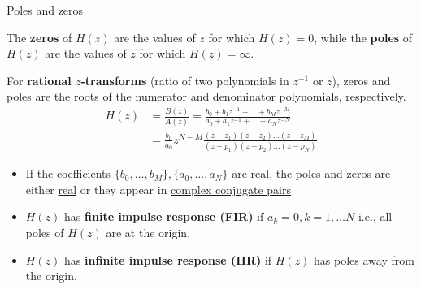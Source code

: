 \documentclass[10pt, handout]{beamer}
\begin{document}
\begin{frame}{Poles and zeros}

The \textbf{zeros} of $H(z)$ are the values of $z$ for which $H(z) = 0$, while the \textbf{poles} of $H(z)$ are the values of $z$ for which $H(z) = \infty$. 

For \textbf{rational $z$-transforms} (ratio of two polynomials in $z^{-1}$ or $z$), zeros and poles are the roots of the numerator and denominator polynomials, respectively.
\begin{align*}
H(z) &= \frac{B(z)}{A(z)} = \frac{b_0 + b_1z^{-1}+\ldots+b_Mz^{-M}}{a_0 + a_1z^{-1}+\ldots+a_Nz^{-N}} \\
&= \frac{b_0}{a_0}z^{N-M}\frac{(z-z_1)(z-z_2)\ldots(z-z_M)}{(z-p_1)(z-p_2)\ldots(z-p_N)}
\end{align*}
\begin{itemize}
	\pause\item If the coefficients $\{b_0, \ldots, b_M\}, \{a_0, \ldots, a_N\}$ are \underline{real}, the poles and zeros are either \underline{real} or they appear in \underline{complex conjugate pairs}
	\pause\item $H(z)$ has \textbf{finite impulse response (FIR)} if $a_k = 0, k = 1, \ldots N$ i.e., all poles of $H(z)$ are at the origin.
	\pause\item $H(z)$ has \textbf{infinite impulse response (IIR)} if $H(z)$ has poles away from the origin.
\end{itemize}	
\end{frame}
\end{document}
